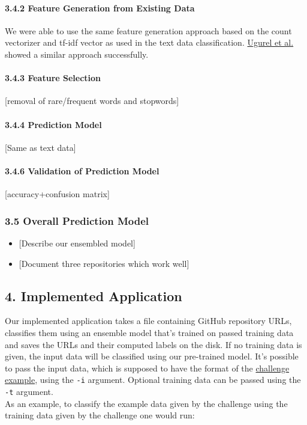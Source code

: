 \documentclass{article}
\providecommand{\tightlist}{%
  \setlength{\itemsep}{0pt}\setlength{\parskip}{0pt}}
\begin{document}
\paragraph{3.4.2 Feature Generation from Existing
Data}\label{feature-generation-from-existing-data-1}

We were able to use the same feature generation approach based on the
count vectorizer and tf-idf vector as used in the text data
classification.
\href{https://clgiles.ist.psu.edu/papers/KDD-2002-whatsthecode.pdf}{Ugurel
et al.} showed a similar approach successfully.

\paragraph{3.4.3 Feature Selection}\label{feature-selection-2}

{[}removal of rare/frequent words and stopwords{]}

\paragraph{3.4.4 Prediction Model}\label{prediction-model-2}

{[}Same as text data{]}

\paragraph{3.4.6 Validation of Prediction
Model}\label{validation-of-prediction-model-2}

{[}accuracy+confusion matrix{]}

\subsubsection{3.5 Overall Prediction
Model}\label{overall-prediction-model}

\begin{itemize}
\tightlist
\item
  {[}Describe our ensembled model{]}
\item
  {[}Document three repositories which work well{]}
\end{itemize}

\subsection{4. Implemented Application}\label{implemented-application}

Our implemented application takes a file containing GitHub repository
URLs, classifies them using an ensemble model that's trained on passed
training data and saves the URLs and their computed labels on the disk.
If no training data is given, the input data will be classified using
our pre-trained model. It's possible to pass the input data, which is
supposed to have the format of the
\href{https://github.com/InformatiCup/InformatiCup2017/blob/master/example-input}{challenge
example}, using the \texttt{-i} argument. Optional training data can be
passed using the \texttt{-t} argument.\\
As an example, to classify the example data given by the challenge using
the training data given by the challenge one would run: ~
\end{document}
